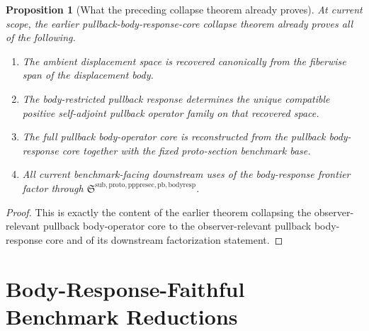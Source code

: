 \documentclass[11pt]{article}
\newcommand{\PullbackBodyResponseCore}{\mathfrak S^{\mathrm{sub,proto,pppresec,pb,bodyresp}}}
\newtheorem{proposition}{Proposition}
\begin{document}
\begin{proposition}[What the preceding collapse theorem already proves]
\label{prop:collapse}
At current scope, the earlier pullback-body-response-core collapse theorem already proves all of the following.
\begin{enumerate}
    \item The ambient displacement space is recovered canonically from the fiberwise span of the displacement body.
    \item The body-restricted pullback response determines the unique compatible positive self-adjoint pullback operator family on that recovered space.
    \item The full pullback body-operator core is reconstructed from the pullback body-response core together with the fixed proto-section benchmark base.
    \item All current benchmark-facing downstream uses of the body-response frontier factor through \(\PullbackBodyResponseCore\).
\end{enumerate}
\end{proposition}

\begin{proof}
This is exactly the content of the earlier theorem collapsing the observer-relevant pullback body-operator core to the observer-relevant pullback body-response core and of its downstream factorization statement.
\end{proof}

\section{Body-Response-Faithful Benchmark Reductions}
\end{document}
